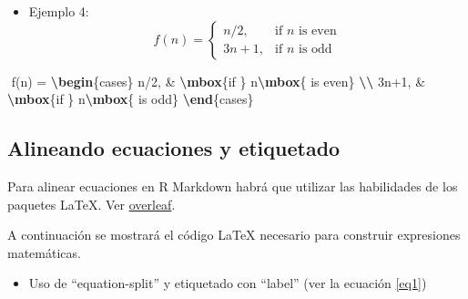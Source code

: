 \documentclass[12pt,a4paper,]{book}
\newenvironment{Shaded}{\begin{snugshade}}{\end{snugshade}}
\newcommand{\ExtensionTok}[1]{#1}
\newcommand{\KeywordTok}[1]{\textcolor[rgb]{0.13,0.29,0.53}{\textbf{#1}}}
\newcommand{\NormalTok}[1]{#1}
\newcommand{\SpecialCharTok}[1]{\textcolor[rgb]{0.81,0.36,0.00}{\textbf{#1}}}
\newcommand{\SpecialStringTok}[1]{\textcolor[rgb]{0.31,0.60,0.02}{#1}}
\providecommand{\tightlist}{%
  \setlength{\itemsep}{0pt}\setlength{\parskip}{0pt}}
\numberwithin{dummy}{section}
\theoremstyle{ocrenumbox}
\theoremstyle{blacknumex}
\theoremstyle{blacknumbox}
\theoremstyle{ocrenum}
\theoremstyle{ocrenum}
\begin{document}
\begin{itemize}
\tightlist
\item
  Ejemplo 4: \[
  f(n) = 
  \begin{cases} 
  n/2,  & \mbox{if } n\mbox{ is even} \\ 
  3n+1, & \mbox{if } n\mbox{ is odd} 
  \end{cases}
  \]
\end{itemize}

\begin{Shaded}
\begin{Highlighting}[]
\SpecialStringTok{$$}
\SpecialStringTok{f(n) = }
\KeywordTok{\textbackslash{}begin}\NormalTok{\{}\ExtensionTok{cases}\NormalTok{\}}\SpecialStringTok{ }
\SpecialStringTok{  n/2,  \& }\SpecialCharTok{\textbackslash{}mbox}\NormalTok{\{if \}}\SpecialStringTok{ n}\SpecialCharTok{\textbackslash{}mbox}\SpecialStringTok{\{ is even\} }\SpecialCharTok{\textbackslash{}\textbackslash{}}\SpecialStringTok{ }
\SpecialStringTok{  3n+1, \& }\SpecialCharTok{\textbackslash{}mbox}\NormalTok{\{if \}}\SpecialStringTok{ n}\SpecialCharTok{\textbackslash{}mbox}\SpecialStringTok{\{ is odd\} }
\KeywordTok{\textbackslash{}end}\NormalTok{\{}\ExtensionTok{cases}\NormalTok{\}}
\SpecialStringTok{$$}
\end{Highlighting}
\end{Shaded}

\hypertarget{etiquetadomatematico}{%
\subsection{Alineando ecuaciones y
etiquetado}\label{etiquetadomatematico}}

Para alinear ecuaciones en R Markdown habrá que utilizar las habilidades
de los paquetes LaTeX. Ver
\href{https://www.overleaf.com/learn/latex/Aligning_equations_with_amsmath}{overleaf}.

A continuación se mostrará el código LaTeX necesario para construir
expresiones matemáticas.

\begin{itemize}
\tightlist
\item
  Uso de ``equation-split'' y etiquetado con ``label'' (ver la ecuación
  \ref{eq1})
\end{itemize}
\end{document}
